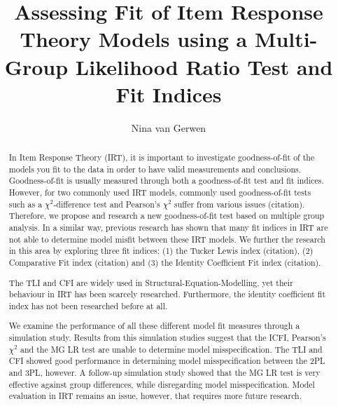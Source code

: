 \documentclass[Royal,sageapa,times,doublespace]{sagej}
\begin{document}

\title{Assessing Fit of Item Response Theory Models using a Multi-Group Likelihood Ratio Test and Fit Indices}

\author{Nina van Gerwen } %




\begin{abstract}
In Item Response Theory (IRT), it is important to investigate goodness-of-fit of the models you fit to the data in order to have valid measurements and conclusions. Goodness-of-fit is usually measured through both a goodness-of-fit test and fit indices. However, for two commonly used IRT models, commonly used goodness-of-fit tests such as a $\chi^2$-difference test and Pearson's $\chi^2$ suffer from various issues (citation). Therefore, we propose and research a new goodness-of-fit test based on multiple group analysis. In a similar way, previous research has shown that many fit indices in IRT are not able to determine model misfit between these IRT models. We further the research in this area by exploring three fit indices: (1) the Tucker Lewis index (citation), (2) Comparative Fit index (citation) and (3) the Identity Coefficient Fit index (citation). 

The TLI and CFI are widely used in Structural-Equation-Modelling, yet their behaviour in IRT has been scarcely researched. Furthermore, the identity coefficient fit index has not been researched before at all. 

We examine the performance of all these different model fit measures through a simulation study. Results from this simulation studies suggest that the ICFI, Pearson's $\chi^2$ and the MG LR test are unable to determine model misspecification. The TLI and CFI showed good performance in determining model misspecification between the 2PL and 3PL, however. A follow-up simulation study showed that the MG LR test is very effective against group differences, while disregarding model misspecification. Model evaluation in IRT remains an issue, however, that requires more future research. 

\end{abstract}
\end{document}
